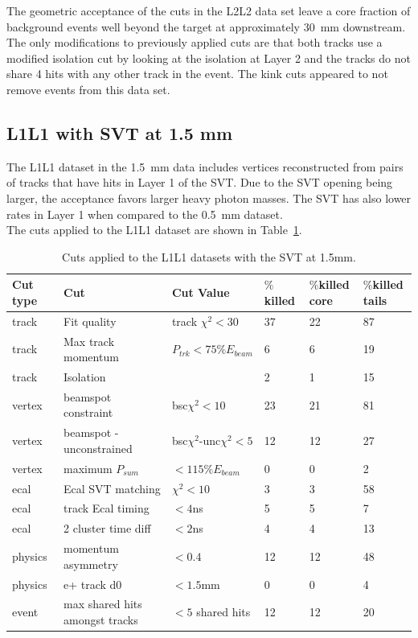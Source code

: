 The geometric acceptance of the cuts in the L2L2 data set leave a core fraction of background events well beyond the target at approximately 30~mm downstream. The only modifications to previously applied cuts are that both tracks use a modified isolation cut by looking at the isolation at Layer 2 and the tracks do not share 4 hits with any other track in the event.  The kink cuts appeared to not remove events from this data set.

\subsection{L1L1 with SVT at 1.5 mm}
The L1L1 dataset in the 1.5~mm data includes vertices reconstructed from pairs of tracks that have hits in Layer 1 of the SVT. Due to the SVT opening being larger, the acceptance favors larger heavy photon masses. The SVT has also lower rates in Layer 1 when compared to the 0.5~mm dataset.\\
\indent The cuts applied to the L1L1 dataset are shown in Table~\ref{l1l1_cuts_1p5}.

\begin{table}[H]
\caption{Cuts applied to the L1L1 datasets with the SVT at 1.5mm.}
\label{l1l1_cuts_1p5}
\centering
\begin{tabular}{llllll}
\toprule
Cut type & Cut & Cut Value &  $\%$killed &  $\%$killed core & $\%$killed tails\\
\midrule
track & Fit quality & track $\chi^{2}<30$ & 37 & 22 & 87 \\
track & Max track momentum &  $P_{trk}<75\%E_{beam}$ & 6 & 6 & 19 \\
track & Isolation &   & 2 & 1 & 15 \\
vertex & beamspot constraint & bsc$\chi^{2}<10$  & 23 & 21 & 81 \\
vertex & beamspot - unconstrained & bsc$\chi^{2}$-unc$\chi^2<5$  & 12 & 12 & 27 \\
vertex & maximum $P_{sum}$ &  $<115\%E_{beam}$ & 0 & 0 & 2 \\
ecal & Ecal SVT matching & $\chi^2<10$  & 3 & 3 & 58 \\
ecal & track Ecal timing & $<4$ns  & 5 & 5 & 7 \\
ecal & 2 cluster time diff & $<2$ns  & 4 & 4 & 13 \\
physics & momentum asymmetry & $<0.4$  & 12 & 12 & 48 \\
physics & e+ track d0 & $<1.5$mm  & 0 & 0 & 4 \\
event & max shared hits amongst tracks & $<5$ shared hits  & 12 & 12 & 20 \\
\bottomrule
\end{tabular}
\end{table}

